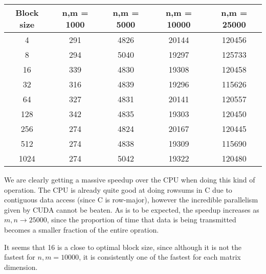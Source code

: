 \documentclass[a4paper, fleqn]{article}
\begin{document}
        \begin{center}
 \begin{tabular}{||c | c | c | c | c ||}
 \hline
 Block size & n,m = 1000 & n,m = 5000 & n,m = 10000 & n,m = 25000 \\ [0.5ex] 
 \hline
 4 & 291 & 4826 & 20144 & 120456 \\
 \hline
 8 & 294 & 5040 & 19297 & 125733 \\
 \hline
 16 & 339 & 4830 & 19308 & 120458 \\
 \hline
 32 & 316 & 4839 & 19296 & 115626 \\
 \hline
 64 & 327 & 4831 & 20141 & 120557 \\
 \hline
 128 & 342 & 4835 & 19303 & 120450 \\
 \hline
 256 & 274 & 4824 & 20167 & 120445 \\
 \hline
 512 & 274 & 4838 & 19309 & 115690 \\
 \hline
 1024 & 274 & 5042 & 19322 & 120480 \\
 \hline

 \hline
\end{tabular}
\end{center}
We are clearly getting a massive speedup over the CPU when doing this kind of operation. The CPU is already quite good at doing rowsums in C due to contiguous data access (since C is row-major), however the incredible parallelism given by CUDA cannot be beaten. As is to be expected, the speedup increases as $m,n \to 25000$, since the proportion of time that data is being transmitted becomes a smaller fraction of the entire opration.

It seems that 16 is a close to optimal block size, since although it is not the fastest for $n, m = 10000$, it is consistently one of the fastest for each matrix dimension.
\pagebreak
\end{document}
